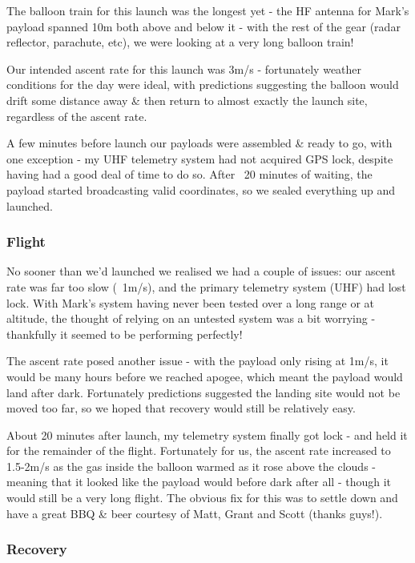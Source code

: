 \documentclass[a4paper,12pt]{article}
\begin{document}
\begin{appendices}
The balloon train for this launch was the longest yet - the HF antenna for Mark's payload spanned 10m both above and below it - with the rest of the gear (radar reflector, parachute, etc), we were looking at a very long balloon train!

Our intended ascent rate for this launch was 3m/s - fortunately weather conditions for the day were ideal, with predictions suggesting the balloon would drift some distance away \& then return to almost exactly the launch site, regardless of the ascent rate.

A few minutes before launch our payloads were assembled \& ready to go, with one exception - my UHF telemetry system had not acquired GPS lock, despite having had a good deal of time to do so. After ~20 minutes of waiting, the payload started broadcasting valid coordinates, so we sealed everything up and launched.

\subsubsection*{Flight}

No sooner than we'd launched we realised we had a couple of issues: our ascent rate was far too slow (~1m/s), and the primary telemetry system (UHF) had lost lock. With Mark's system having never been tested over a long range or at altitude, the thought of relying on an untested system was a bit worrying - thankfully it seemed to be performing perfectly!

The ascent rate posed another issue - with the payload only rising at 1m/s, it would be many hours before we reached apogee, which meant the payload would land after dark. Fortunately predictions suggested the landing site would not be moved too far, so we hoped that recovery would still be relatively easy.

About 20 minutes after launch, my telemetry system finally got lock - and held it for the remainder of the flight. Fortunately for us, the ascent rate increased to 1.5-2m/s as the gas inside the balloon warmed as it rose above the clouds - meaning that it looked like the payload would before dark after all - though it would still be a very long flight. The obvious fix for this was to settle down and have a great BBQ \& beer courtesy of Matt, Grant and Scott (thanks guys!).

\subsubsection*{Recovery}


\end{appendices}
\end{document}
